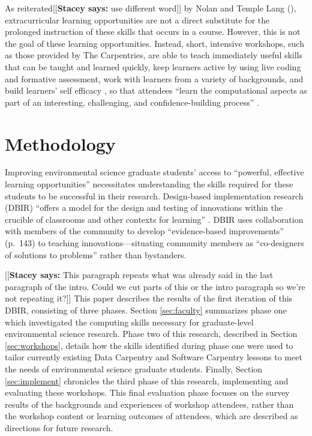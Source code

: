 \documentclass[12pt]{article}
\newcommand{\stacey}[1]{{\color{purple}[[\textbf{Stacey says: }#1]]}}
\begin{document}
\quad As reiterated\stacey{use different word} by Nolan and Temple Lang (\citeyear{esr}), extracurricular
learning opportunities are not a direct substitute for the prolonged instruction
of these skills that occurs in a course. However, this is not the goal 
of these learning opportunities. Instead, short, intensive workshops, such as
those provided by The Carpentries, are able to teach immediately useful skills
that can be taught and learned quickly, keep learners active by using live
coding and formative assessment, work with learners from a variety of
backgrounds, and build learners' self efficacy \citep{null-carpentries}, so that
attendees ``learn the computational aspects as part of an interesting, 
challenging, and confidence-building process'' \citep[p.\ 101]{nolan}.

\section{Methodology}

\quad Improving environmental science graduate students' access to ``powerful,
effective learning opportunities'' \citep[p.\ 137]{penuel} necessitates
understanding the skills required for these students to be successful in their
research. Design-based implementation research (DBIR) \citep{confrey, penuel,
oneill} ``offers a model for the design and testing of innovations
within the crucible of classrooms and other contexts for learning'' 
\citep[p.\ 140]{penuel}. DBIR uses collaboration with members of the
community to develop ``evidence-based improvements'' (p.\ 143) to teaching 
innovations---situating community members as ``co-designers of solutions to 
problems'' \citep[p.\ 140]{penuel} rather than bystanders. 

\stacey{This paragraph repeats what was already said in the last paragraph of the intro.
Could we cut parts of this or the intro paragraph so we're not repeating it?}
\quad This paper describes the results of the first iteration of this DBIR, 
consisting of three phases. Section \ref{sec:faculty} summarizes phase one which 
investigated the computing skills necessary for graduate-level environmental
science research. Phase two of this research, described in Section 
\ref{sec:workshops}, details how the skills identified during phase one were
used to tailor currently existing Data Carpentry \citeyear{data-carpentry} and
Software Carpentry \citeyear{software-carpentry} lessons to meet the needs of
environmental science graduate students. Finally, Section \ref{sec:implement}
chronicles the third phase of this research, implementing and evaluating these
workshops. This final evaluation phase focuses on the survey results of the 
backgrounds and experiences of workshop attendees, rather than the workshop
content or learning outcomes of attendees, which are described as directions for
future research. 
\end{document}
